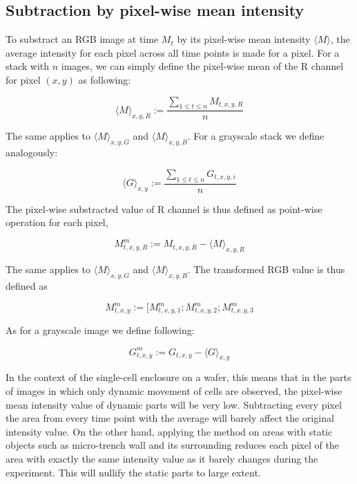 \documentclass[pdftex,12pt,a4paper]{report}
\begin{document}
\subsection{Subtraction by pixel-wise mean intensity}
\label{subsection:substraction_by_mean}

To substract an RGB image at time $M_t$ by its pixel-wise mean intensity $\langle M \rangle$, the average intensity for each pixel across all time points is made for a pixel. For a stack with $n$ images, we can simply define the pixel-wise mean of the R channel for pixel $(x, y)$ as following:

\begin{equation}
\langle M \rangle_{x, y, R} := \frac{\sum_{1 \leq t \leq n} M_{t, x, y, R}}{n}
\label{eq:mean_calc_rgb}
\end{equation}

The same applies to $\langle M \rangle_{x, y, G}$ and $\langle M \rangle_{x, y, B}$. For a grayscale stack we define analogously:

\begin{equation}
\langle G \rangle_{x, y} := \frac{\sum_{1 \leq t \leq n} G_{t, x, y, i}}{n}
\label{eq:mean_calc_gs}
\end{equation}

The pixel-wise substracted value of R channel is thus defined as point-wise operation for each pixel,

\begin{equation}
M^m_{t, x, y, R} := M_{t, x, y, R} - \langle M \rangle_{x, y, R}
\label{eq:mean_corr_rgb}
\end{equation}

The same applies to $\langle M \rangle_{x, y, G}$ and $\langle M \rangle_{x, y, B}$. The transformed RGB value is thus defined as

\begin{equation}
M^m_{t, x, y} := [M^m_{t, x, y, 1}; M^m_{t, x, y, 2}; M^m_{t, x, y, 3}
\end{equation}

As for a grayscale image we define following:

\begin{equation}
G^m_{t, x, y} := G_{t, x, y} - \langle G \rangle_{x, y}
\label{eq:mean_corr_gs}
\end{equation}

In the context of the single-cell enclosure on a wafer, this means that in the parts of images in which only dynamic movement of cells are observed, the pixel-wise mean intensity value of dynamic parts will be very low. Subtracting every pixel the area from every time point with the average will barely affect the original intensity value. On the other hand, applying the method on areas with static objects such as micro-trench wall and its surrounding reduces each pixel of the area with exactly the same intensity value as it barely changes during the experiment. This will nullify the static parts to large extent.
\end{document}
